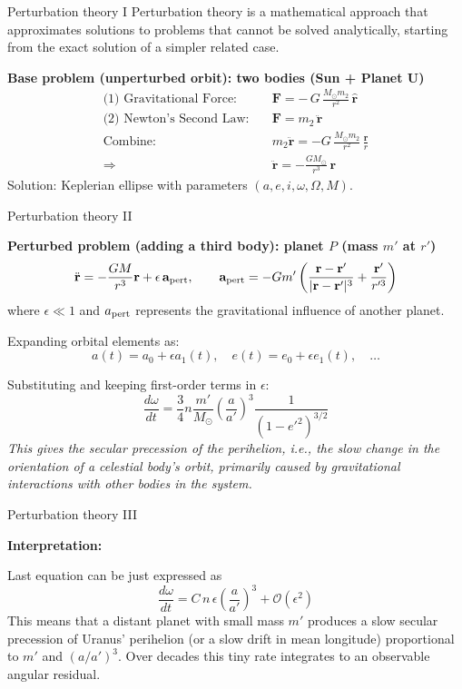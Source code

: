 \documentclass{beamer}
\begin{document}
	\begin{frame}{Perturbation theory I}
		Perturbation theory is a mathematical approach that approximates solutions to problems that cannot be solved analytically, starting from the exact solution of a simpler related case.
		\vspace{3mm}
		
		\textbf{Base problem (unperturbed orbit): two bodies (Sun + Planet U)}
		\small
		\begin{align*}
			\text{(1) Gravitational Force:} \quad & \mathbf{F} = -\,G\,\frac{M_\odot m_2}{r^2}\,\hat{\mathbf{r}} \\[4pt]
			\text{(2) Newton’s Second Law:} \quad & \mathbf{F} = m_2\,\ddot{\mathbf{r}} \\[4pt]
			\text{Combine:} \quad & m_2 \ddot{\mathbf{r}} = -G\,\frac{M_\odot m_2}{r^2}\,\frac{\mathbf{r}}{r} \\[4pt]
			\Rightarrow \quad & \boxed{\ddot{\mathbf{r}} = -\frac{GM_\odot}{r^3}\,\mathbf{r}}
		\end{align*}	
		Solution: Keplerian ellipse with parameters $(a, e, i, \omega, \Omega, M)$.
	\end{frame}
	
	
	\begin{frame}{Perturbation theory II}
		
		\textbf{Perturbed problem (adding a third body): planet $P$ (mass $m'$ at $r'$)}
		\[
		\ddot{\mathbf r} = -\frac{G M}{r^3}\mathbf r + \epsilon\,\mathbf a_{\rm pert},\qquad
		\mathbf a_{\rm pert} = -G m'\left(\frac{\mathbf r-\mathbf r'}{|\mathbf r-\mathbf r'|^3} + \frac{\mathbf r'}{r'^3}\right)
		\]
		where $\epsilon \ll 1$ and $a_{\rm pert}$ represents the gravitational influence of another planet.
		
		\medskip
		Expanding orbital elements as:
		\[
		a(t) = a_0 + \epsilon a_1(t), \quad e(t) = e_0 + \epsilon e_1(t), \quad \ldots
		\]
		
		Substituting and keeping first-order terms in $\epsilon$:
		\[
		\frac{d\omega}{dt} = \frac{3}{4}n\frac{m'}{M_\odot}\left(\frac{a}{a'}\right)^3\!\!\frac{1}{(1 - e'^2)^{3/2}}
		\]
		\textit{This gives the secular precession of the perihelion, i.e., the slow change in the orientation of a celestial body's orbit, primarily caused by gravitational interactions with other bodies in the system.}
		
	\end{frame}
	
	\begin{frame}{Perturbation theory III}
		
		\textbf{Interpretation:}
		\Large
		
		Last equation can be just expressed as 
		\[
		\frac{d\omega}{dt} = C \, n \, \epsilon\left(\frac{a}{a'}\right)^3+\mathcal{O}(\epsilon^2)
		\]
		This means that a distant planet with small mass $m'$ produces a slow secular precession of Uranus’ perihelion (or a slow drift in mean longitude) proportional to $m'$ and $(a/a')^3$. Over decades this tiny rate integrates to an observable angular residual.
	\end{frame}
	
\end{document}
